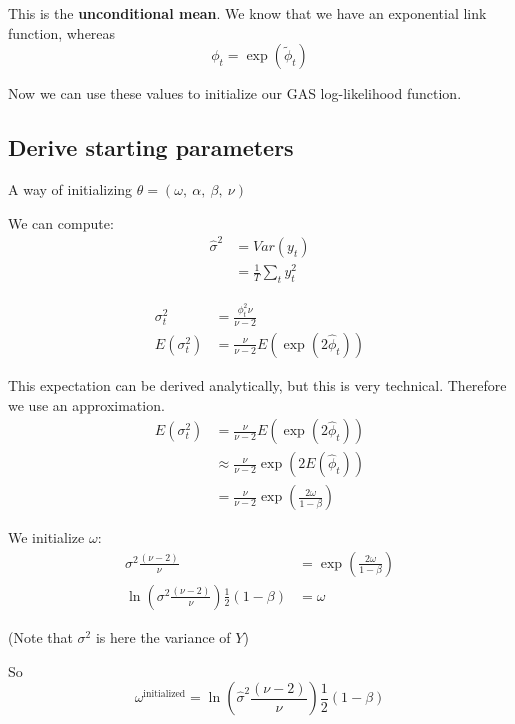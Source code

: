\documentclass{article}
\begin{document}
This is the \textbf{unconditional mean}. We know that we have an exponential
link function, whereas 
\[
\phi_{t}=\exp\left(\widetilde{\phi}_{t}\right)
\]

Now we can use these values to initialize our GAS log-likelihood function.


\subsection{Derive starting parameters}

A way of initializing $\theta=\left(\omega,\ \alpha,\ \beta,\ \nu\right)$

We can compute: 
\begin{align*}
\hat{\sigma}^{2} & =Var\left(y_{t}\right)\\
 & =\frac{1}{T}\sum_{t}y_{t}^{2}
\end{align*}

\begin{align*}
\sigma_{t}^{2} & =\frac{\phi_{t}^{2}\nu}{\nu-2}\\
E\left(\sigma_{t}^{2}\right) & =\frac{\nu}{\nu-2}E\left(\exp\left(2\hat{\phi}_{t}\right)\right)
\end{align*}

This expectation can be derived analytically, but this is very technical.
Therefore we use an approximation. 
\begin{align*}
E\left(\sigma_{t}^{2}\right) & =\frac{\nu}{\nu-2}E\left(\exp\left(2\hat{\phi}_{t}\right)\right)\\
 & \approx\frac{\nu}{\nu-2}\exp\left(2E\left(\hat{\phi}_{t}\right)\right)\\
 & =\frac{\nu}{\nu-2}\exp\left(\frac{2\omega}{1-\beta}\right)
\end{align*}

We initialize $\omega$: 
\begin{align*}
\sigma^{2}\frac{\left(\nu-2\right)}{\nu} & =\exp\left(\frac{2\omega}{1-\beta}\right)\\
\ln\left(\sigma^{2}\frac{\left(\nu-2\right)}{\nu}\right)\frac{1}{2}\left(1-\beta\right) & =\omega
\end{align*}

(Note that $\sigma^{2}$ is here the variance of $Y$)

So 
\[
\omega^{\text{initialized}}=\ln\left(\hat{\sigma}^{2}\frac{\left(\nu-2\right)}{\nu}\right)\frac{1}{2}\left(1-\beta\right)
\]
\end{document}
